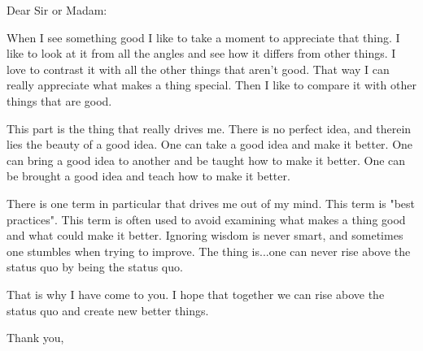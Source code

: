 \documentclass{letter}
\begin{document}
\begin{letter}{}
\opening{Dear Sir or Madam:}

When I see something good I like to take a moment to appreciate that thing.
I like to look at it from all the angles and see how it differs from other things.
I love to contrast it with all the other things that aren't good.
That way I can really appreciate what makes a thing special.
Then I like to compare it with other things that are good.

This part is the thing that really drives me.
There is no perfect idea, and therein lies the beauty of a good idea.
One can take a good idea and make it better.
One can bring a good idea to another and be taught how to make it better.
One can be brought a good idea and teach how to make it better.

There is one term in particular that drives me out of my mind. This term is "best practices".
This term is often used to avoid examining what makes a thing good and what could make it better.
Ignoring wisdom is never smart, and sometimes one stumbles when trying to improve.
The thing is...one can never rise above the status quo by being the status quo.

That is why I have come to you.
I hope that together we can rise above the status quo and create new better things.

\closing{Thank you,}
\end{letter}
\end{document}
